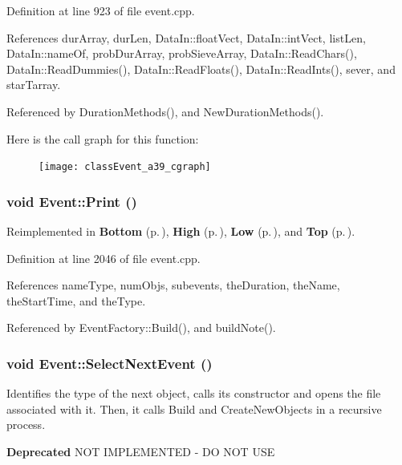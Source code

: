 Definition at line 923 of file event.cpp.

References dur\-Array, dur\-Len, Data\-In::float\-Vect, Data\-In::int\-Vect, list\-Len, Data\-In::name\-Of, prob\-Dur\-Array, prob\-Sieve\-Array, Data\-In::Read\-Chars(), Data\-In::Read\-Dummies(), Data\-In::Read\-Floats(), Data\-In::Read\-Ints(), sever, and star\-Tarray.

Referenced by Duration\-Methods(), and New\-Duration\-Methods().

Here is the call graph for this function:\begin{figure}[H]
\begin{center}
\leavevmode
\texttt{[image: classEvent\_a39\_cgraph]}
\end{center}
\end{figure}
\subsubsection{\setlength{\rightskip}{0pt plus 5cm}void Event::Print ()\hspace{0.3cm}{\tt  [virtual]}}\label{classEvent_a57}




Reimplemented in {\bf Bottom} {\rm (p.\,\pageref{classBottom_a30})}, {\bf High} {\rm (p.\,\pageref{classHigh_a5})}, {\bf Low} {\rm (p.\,\pageref{classLow_a5})}, and {\bf Top} {\rm (p.\,\pageref{classTop_a8})}.

Definition at line 2046 of file event.cpp.

References name\-Type, num\-Objs, subevents, the\-Duration, the\-Name, the\-Start\-Time, and the\-Type.

Referenced by Event\-Factory::Build(), and build\-Note().
\subsubsection{\setlength{\rightskip}{0pt plus 5cm}void Event::Select\-Next\-Event ()}\label{classEvent_a45}


Identifies the type of the next object, calls its constructor and opens the file associated with it. Then, it calls Build and Create\-New\-Objects in a recursive process. 

\begin{Desc}
\item[{\bf Deprecated}]NOT IMPLEMENTED - DO NOT USE \end{Desc}
